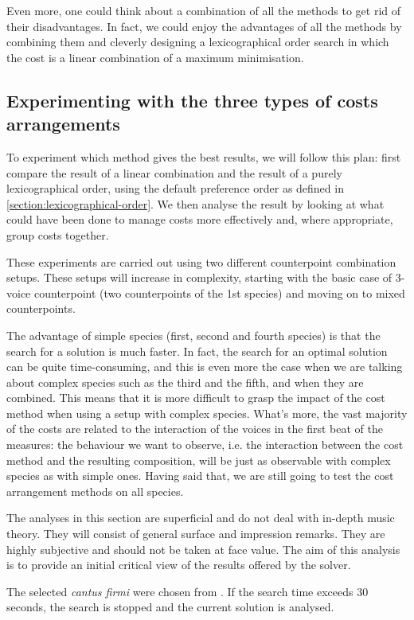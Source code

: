 Even more, one could think about a combination of all the methods to get rid of their disadvantages. In fact, we could enjoy the advantages of all the methods by combining them and cleverly designing a lexicographical order search in which the cost is a linear combination of a maximum minimisation.

\subsection{Experimenting with the three types of costs arrangements}
To experiment which method gives the best results, we will follow this plan: first compare the result of a linear combination and the result of a purely lexicographical order, using the default preference order as defined in \ref{section:lexicographical-order}. We then analyse the result by looking at what could have been done to manage costs more effectively and, where appropriate, group costs together.


These experiments are carried out using two different counterpoint combination setups. These setups will increase in complexity, starting with the basic case of 3-voice counterpoint (two counterpoints of the 1st species) and moving on to mixed counterpoints. 

The advantage of simple species (first, second and fourth species) is that the search for a solution is much faster. In fact, the search for an optimal solution can be quite time-consuming, and this is even more the case when we are talking about complex species such as the third and the fifth, and when they are combined. This means that it is more difficult to grasp the impact of the cost method when using a setup with complex species. What's more, the vast majority of the costs are related to the interaction of the voices in the first beat of the measures: the behaviour we want to observe, i.e. the interaction between the cost method and the resulting composition, will be just as observable with complex species as with simple ones. Having said that, we are still going to test the cost arrangement methods on all species.

The analyses in this section are superficial and do not deal with in-depth music theory. They will consist of general surface and impression remarks. They are highly subjective and should not be taken at face value. The aim of this analysis is to provide an initial critical view of the results offered by the solver.

The selected \textit{cantus firmi} were chosen from \gap. If the search time exceeds 30 seconds, the search is stopped and the current solution is analysed.
